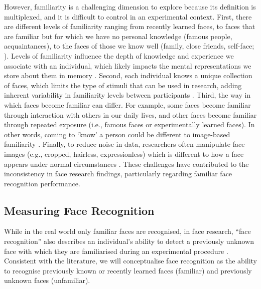 \documentclass[
  10pt,
  letterpaper,
]{article}
\begin{document}
However, familiarity is a challenging dimension to explore because its
definition is multiplexed, and it is difficult to control in an
experimental context. First, there are different levels of familiarity
ranging from recently learned faces, to faces that are familiar but for
which we have no personal knowledge (famous people, acquaintances), to
the faces of those we know well (family, close friends, self-face;
\citet{ramon2011a}). Levels of familiarity influence the depth of
knowledge and experience we associate with an individual, which likely
impacts the mental representations we store about them in memory
\citep{ramon2017a}. Second, each individual knows a unique collection of
faces, which limits the type of stimuli that can be used in research,
adding inherent variability in familiarity levels between participants
\citep{ramon2017a}. Third, the way in which faces become familiar can
differ. For example, some faces become familiar through interaction with
others in our daily lives, and other faces become familiar through
repeated exposure (i.e., famous faces or experimentally learned faces).
In other words, coming to `know' a person could be different to
image-based familiarity \citep{kramer2018a}. Finally, to reduce noise in
data, researchers often manipulate face images (e.g., cropped, hairless,
expressionless) which is different to how a face appears under normal
circumstances \citep{burton2011a}. These challenges have contributed to
the inconsistency in face research findings, particularly regarding
familiar face recognition performance.

\subsection{Measuring Face
Recognition}\label{measuring-face-recognition}

While in the real world only familiar faces are recognised, in face
research, ``face recognition'' also describes an individual's ability to
detect a previously unknown face with which they are familiarised during
an experimental procedure \citep{burton2013a, hancock2000a}. Consistent
with the literature, we will conceptualise face recognition as the
ability to recognise previously known or recently learned faces
(familiar) and previously unknown faces (unfamiliar).
\end{document}
